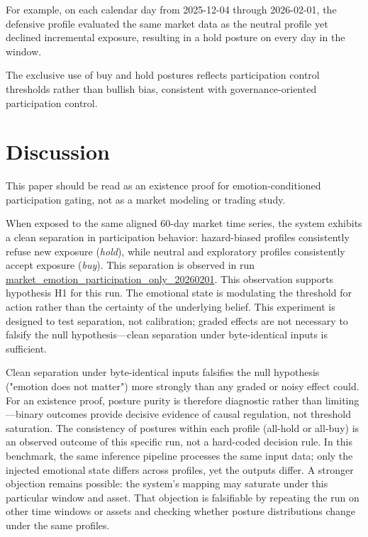 \documentclass[12pt,a4paper]{article}
\begin{document}
For example, on each calendar day from 2025-12-04 through 2026-02-01, the defensive profile evaluated the same market data as the neutral profile yet declined incremental exposure, resulting in a hold posture on every day in the window.

The exclusive use of buy and hold postures reflects participation control thresholds rather than bullish bias, consistent with governance-oriented participation control.

\section{Discussion}

This paper should be read as an existence proof for emotion-conditioned participation gating, not as a market modeling or trading study.

When exposed to the same aligned 60-day market time series, the system exhibits a clean separation in participation behavior: hazard-biased profiles consistently refuse new exposure (\emph{hold}), while neutral and exploratory profiles consistently accept exposure (\emph{buy}). This separation is observed in run \href{https://github.com/jhcragin/SpiralBrain-v3.0-public/tree/main/Emotion-Conditioned%20Risk%20Posture%20in%20Crypto%20Markets/results}{market_emotion_participation_only_20260201}. This observation supports hypothesis H1 for this run. The emotional state is modulating the threshold for action rather than the certainty of the underlying belief.
This experiment is designed to test separation, not calibration; graded effects are not necessary to falsify the null hypothesis—clean separation under byte-identical inputs is sufficient.

Clean separation under byte-identical inputs falsifies the null hypothesis ("emotion does not matter") more strongly than any graded or noisy effect could. For an existence proof, posture purity is therefore diagnostic rather than limiting—binary outcomes provide decisive evidence of causal regulation, not threshold saturation.
The consistency of postures within each profile (all-hold or all-buy) is an observed outcome of this specific run, not a hard-coded decision rule. In this benchmark, the same inference pipeline processes the same input data; only the injected emotional state differs across profiles, yet the outputs differ. A stronger objection remains possible: the system's mapping may saturate under this particular window and asset. That objection is falsifiable by repeating the run on other time windows or assets and checking whether posture distributions change under the same profiles.
\end{document}
